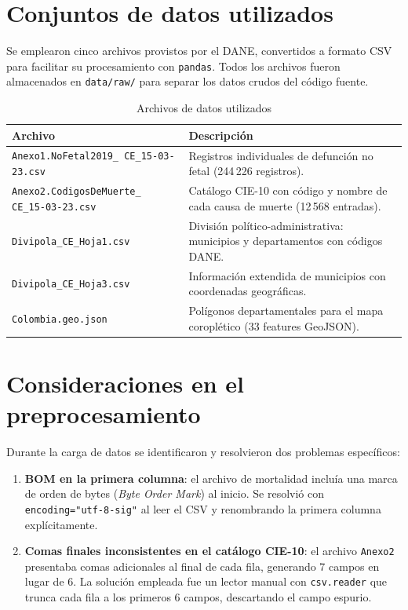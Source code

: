 \documentclass[a4paper,12pt]{report}
\numberwithin{equation}{chapter}
\numberwithin{figure}{chapter}
\numberwithin{table}{chapter}
\begin{document}
\section{Conjuntos de datos utilizados}

Se emplearon cinco archivos provistos por el DANE, convertidos a formato CSV para facilitar su procesamiento con \texttt{pandas}. Todos los archivos fueron almacenados en \texttt{data/raw/} para separar los datos crudos del código fuente.

\begin{table}[H]
    \centering
    \caption{Archivos de datos utilizados}
    \label{tab:datos}
    \begin{tabular}{p{7cm}p{7cm}}
        \toprule
        \textbf{Archivo} & \textbf{Descripción} \\
        \midrule
        \texttt{Anexo1.NoFetal2019\_ CE\_15-03-23.csv} & Registros individuales de defunción no fetal (244\,226 registros). \\[0.5em]
        \texttt{Anexo2.CodigosDeMuerte\_ CE\_15-03-23.csv} & Catálogo CIE-10 con código y nombre de cada causa de muerte (12\,568 entradas). \\[0.5em]
        \texttt{Divipola\_CE\_Hoja1.csv} & División político-administrativa: municipios y departamentos con códigos DANE. \\[0.5em]
        \texttt{Divipola\_CE\_Hoja3.csv} & Información extendida de municipios con coordenadas geográficas. \\[0.5em]
        \texttt{Colombia.geo.json} & Polígonos departamentales para el mapa coroplético (33 features GeoJSON). \\
        \bottomrule
    \end{tabular}
\end{table}

\section{Consideraciones en el preprocesamiento}

Durante la carga de datos se identificaron y resolvieron dos problemas específicos:

\begin{enumerate}
    \item \textbf{BOM en la primera columna}: el archivo de mortalidad incluía una marca de orden de bytes (\textit{Byte Order Mark}) al inicio. Se resolvió con \texttt{encoding="utf-8-sig"} al leer el CSV y renombrando la primera columna explícitamente.

    \item \textbf{Comas finales inconsistentes en el catálogo CIE-10}: el archivo \texttt{Anexo2} presentaba comas adicionales al final de cada fila, generando 7 campos en lugar de 6. La solución empleada fue un lector manual con \texttt{csv.reader} que trunca cada fila a los primeros 6 campos, descartando el campo espurio.
\end{enumerate}
\end{document}
